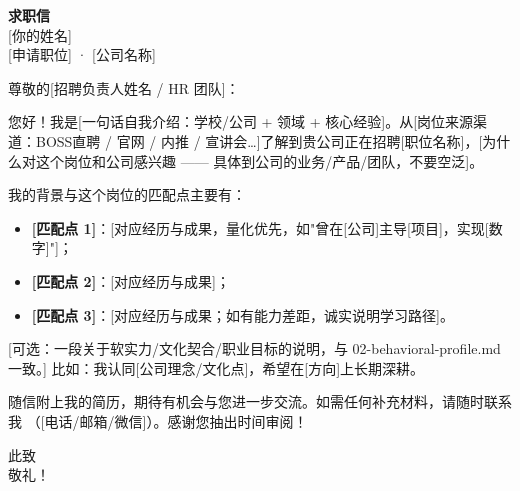 \documentclass[11pt,a4paper]{ctexart}
\begin{document}
\begin{center}
{\LARGE\bfseries 求职信}\\[6pt]
{\normalsize [你的姓名] \quad [联系电话] \quad [邮箱]} \\[2pt]
{\small [申请职位] · [公司名称]}
\end{center}

\vspace{1.5em}

尊敬的[招聘负责人姓名 / HR 团队]：

\hspace{2em}您好！我是[一句话自我介绍：学校/公司 + 领域 + 核心经验]。从[岗位来源渠道：BOSS直聘 /
官网 / 内推 / 宣讲会…]了解到贵公司正在招聘[职位名称]，[为什么对这个岗位和公司感兴趣 ——
具体到公司的业务/产品/团队，不要空泛]。

\hspace{2em}我的背景与这个岗位的匹配点主要有：

\begin{itemize}
  \item \textbf{[匹配点 1]}：[对应经历与成果，量化优先，如"曾在[公司]主导[项目]，实现[数字]"]；
  \item \textbf{[匹配点 2]}：[对应经历与成果]；
  \item \textbf{[匹配点 3]}：[对应经历与成果；如有能力差距，诚实说明学习路径]。
\end{itemize}

\hspace{2em}[可选：一段关于软实力/文化契合/职业目标的说明，与 02-behavioral-profile.md 一致。]
比如：我认同[公司理念/文化点]，希望在[方向]上长期深耕。

\hspace{2em}随信附上我的简历，期待有机会与您进一步交流。如需任何补充材料，请随时联系我
（[电话/邮箱/微信]）。感谢您抽出时间审阅！

\vspace{2em}

此致\\[4pt]
敬礼！

\vspace{2.5em}
\begin{flushright}
[你的姓名]\\
[日期，如 2026 年 X 月 X 日]
\end{flushright}
\end{document}
